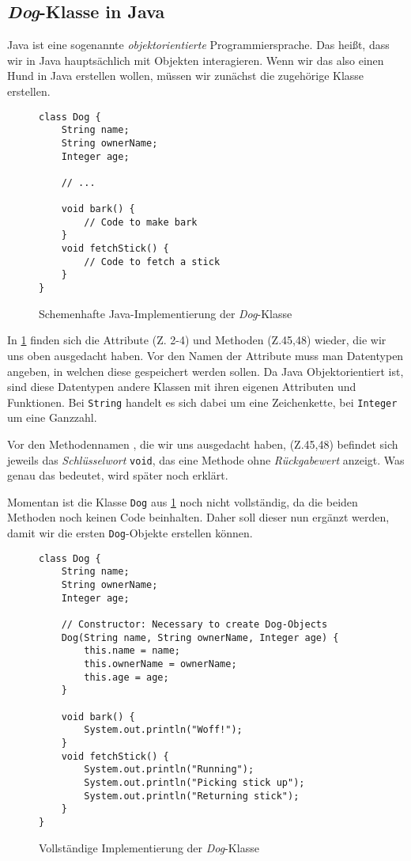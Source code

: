 
\subsection*{\textit{Dog}-Klasse in Java}

Java ist eine sogenannte \textit{objektorientierte} Programmiersprache.
Das heißt, dass wir in Java hauptsächlich mit Objekten interagieren.
Wenn wir das also einen Hund in Java erstellen wollen, müssen wir zunächst die zugehörige Klasse erstellen.

\begin{figure}[H]
    \caption{Schemenhafte Java-Implementierung der \textit{Dog}-Klasse}
    \label{t1:dog-class-scheme}
    \begin{lstlisting}
class Dog {
    String name;
    String ownerName;
    Integer age;

    // ...

    void bark() {
        // Code to make bark
    }
    void fetchStick() {
        // Code to fetch a stick
    }
}
    \end{lstlisting}
\end{figure}

In \ref{t1:dog-class-scheme} finden sich die Attribute (Z. 2-4) und Methoden (Z.45,48) wieder, die wir uns oben ausgedacht haben.
Vor den Namen der Attribute muss man Datentypen angeben, in welchen diese gespeichert werden sollen.
Da Java Objektorientiert ist, sind diese Datentypen andere Klassen mit ihren eigenen Attributen und Funktionen.
Bei \texttt{String} handelt es sich dabei um eine Zeichenkette, bei \texttt{Integer} um eine Ganzzahl.

Vor den Methodennamen , die wir uns ausgedacht haben, (Z.45,48) befindet sich jeweils das \textit{Schlüsselwort} \texttt{void}, das eine Methode ohne \textit{Rückgabewert} anzeigt.
Was genau das bedeutet, wird später noch erklärt.

Momentan ist die Klasse \texttt{Dog} aus \ref{t1:dog-class-scheme} noch nicht vollständig, da die beiden Methoden noch keinen Code beinhalten.
Daher soll dieser nun ergänzt werden, damit wir die ersten \texttt{Dog}-Objekte erstellen können.

\begin{figure}[H]
    \caption{Vollständige Implementierung der \textit{Dog}-Klasse}
    \label{t1:dog-class}
    \begin{lstlisting}
class Dog {
    String name;
    String ownerName;
    Integer age;

    // Constructor: Necessary to create Dog-Objects
    Dog(String name, String ownerName, Integer age) {
        this.name = name;
        this.ownerName = ownerName;
        this.age = age;
    }

    void bark() {
        System.out.println("Woff!");
    }
    void fetchStick() {
        System.out.println("Running");
        System.out.println("Picking stick up");
        System.out.println("Returning stick");
    }
}
    \end{lstlisting}
\end{figure}

